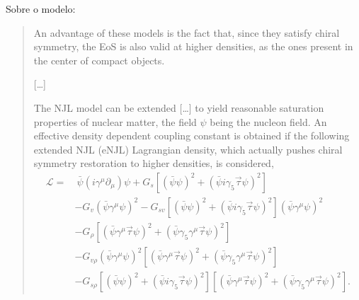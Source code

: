 Sobre o modelo\cite{Pais}:
\begin{quote}
An advantage of these models is the fact that, since they satisfy chiral symmetry, the EoS is also valid at higher densities, as the ones present in the center of compact objects.

[\dots]

The NJL model can be extended [\dots] to yield reasonable saturation properties of nuclear matter, the field $\psi$ being the nucleon field. An effective density dependent coupling constant is obtained if the following extended NJL (eNJL) Lagrangian density, which actually pushes chiral symmetry restoration to higher densities, is considered,
\begin{equation}\label{Eq:Lagrangiana_eNLJ_Pais}
\begin{split}
	\mathcal{L} =&~ \bar{\psi}(i\gamma^\mu\partial_\mu)\psi + G_s[(\bar{\psi}\psi)^2 + (\bar{\psi}i\gamma_5\vec{\tau}\psi)^2] \\
	& - G_v(\bar{\psi}\gamma^\mu\psi)^2 - G_{sv}[(\bar{\psi}\psi)^2 + (\bar{\psi}i\gamma_5\vec{\tau}\psi)^2](\bar{\psi}\gamma^\mu\psi)^2 \\
	& - G_\rho[(\bar{\psi}\gamma^\mu\vec{\tau}\psi)^2 + (\bar{\psi}\gamma_5\gamma^\mu\vec{\tau}\psi)^2] \\
	& - G_{v\rho}(\bar{\psi}\gamma^\mu\psi)^2[(\bar{\psi}\gamma^\mu\vec{\tau}\psi)^2 + (\bar{\psi}\gamma_5\gamma^\mu\vec{\tau}\psi)^2] \\
	& - G_{s\rho} [(\bar{\psi}\psi)^2 + (\bar{\psi}i\gamma_5\vec{\tau}\psi)^2][(\bar{\psi}\gamma^\mu\vec{\tau}\psi)^2 + (\bar{\psi}\gamma_5\gamma^\mu\vec{\tau}\psi)^2].
\end{split}
\end{equation}
\end{quote}

